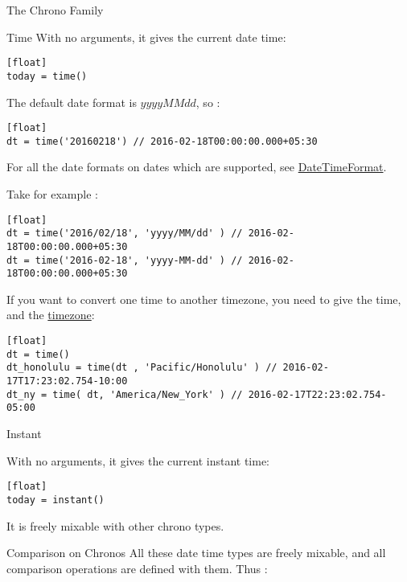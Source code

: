 \begin{section}{The Chrono Family}
\begin{subsection}{Time}
With no arguments, it gives the current date time:

\begin{lstlisting}[style=JexlStyle][float]
today = time()
\end{lstlisting}

The default date format is $yyyyMMdd$, so :
\begin{lstlisting}[style=JexlStyle][float]
dt = time('20160218') // 2016-02-18T00:00:00.000+05:30
\end{lstlisting}

For all the date formats on dates which are supported, 
see \href{http://www.joda.org/joda-time/apidocs/org/joda/time/format/DateTimeFormat.html}{DateTimeFormat}.

Take for example :

\begin{lstlisting}[style=JexlStyle][float]
dt = time('2016/02/18', 'yyyy/MM/dd' ) // 2016-02-18T00:00:00.000+05:30
dt = time('2016-02-18', 'yyyy-MM-dd' ) // 2016-02-18T00:00:00.000+05:30
\end{lstlisting}

If you want to convert one time to another timezone, you need to give the time, 
and the \href{http://joda-time.sourceforge.net/timezones.html}{timezone}:

\begin{lstlisting}[style=JexlStyle][float]
dt = time()
dt_honolulu = time(dt , 'Pacific/Honolulu' ) // 2016-02-17T17:23:02.754-10:00 
dt_ny = time( dt, 'America/New_York' ) // 2016-02-17T22:23:02.754-05:00
\end{lstlisting}

\end{subsection}


\begin{subsection}{Instant}

With no arguments, it gives the current instant time:

\begin{lstlisting}[style=JexlStyle][float]
today = instant()
\end{lstlisting}

It is freely mixable with other chrono types.

\end{subsection}


\begin{subsection}{Comparison on Chronos}
All these date time types are freely mixable, 
and all comparison operations are defined with them.
Thus :


\end{subsection}
\end{section}

